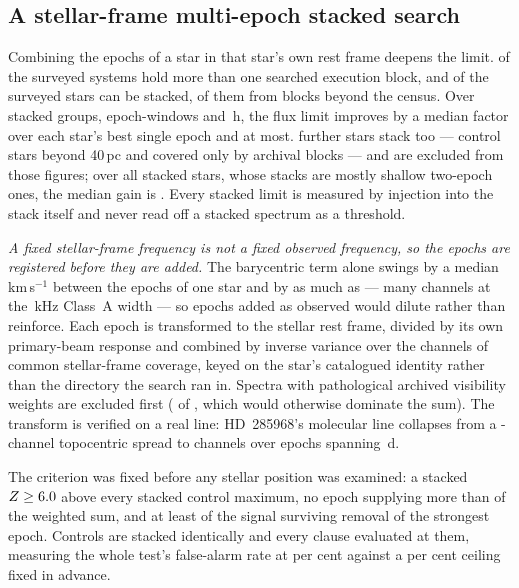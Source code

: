 \subsection{A stellar-frame multi-epoch stacked search}
\label{sec:stack}

Combining the epochs of a star in that star's own rest frame deepens the
limit. \EpMulti{} of the \NSystems{} surveyed systems hold more than one
searched execution block, and \SxStkStarCensus{} of the surveyed stars can be
stacked, \SttNStkOneEb{} of them from blocks beyond the census. Over
\SyStkNGroup{} stacked groups, \SyStkNEpochComb{} epoch-windows and
\SyStkHours\,h, the flux limit improves by a median factor \SyStkGainMed{}
over each star's best single epoch and \SyStkGainMax{} at most.
\SxStkStarOutside{} further stars stack too --- \SyStkStarOos{} control stars
beyond 40\,pc and \SyStkStarOther{} covered only by archival blocks --- and are
excluded from those figures; over all \StkNStar{} stacked stars, whose stacks
are mostly shallow two-epoch ones, the median gain is \StkLimitGainMed. Every
stacked limit is measured by injection into the stack itself and never read
off a stacked spectrum as a threshold.

\emph{A fixed stellar-frame frequency is not a fixed observed frequency, so
the epochs are registered before they are added.} The barycentric term alone
swings by a median \StkVcorrSwingMed\,km\,s$^{-1}$ between the epochs of one
star and by as much as \StkVcorrSwingMax{} --- many channels at the
\StkRefChanKHz\,kHz Class~A width --- so epochs added as observed would dilute
rather than reinforce. Each epoch is transformed to the stellar rest frame,
divided by its own primary-beam response and combined by inverse variance
over the channels of common stellar-frame coverage, keyed on the star's
catalogued identity rather than the directory the search ran in. Spectra with
pathological archived visibility weights are excluded first
(\StkBadWeight{} of \StkNProd, which would otherwise dominate the sum). The transform is verified on a real line: HD~285968's molecular
line collapses from a \StkRegTopoChan-channel topocentric spread to
\StkRegStellarChan{} channels over \StkRegNEpoch{} epochs spanning
\StkRegSpanD\,d.

The criterion was fixed before any stellar position was examined: a stacked
$Z\ge6.0$ above every stacked control maximum, no epoch supplying more
than \StkDomMax{} of the weighted sum, and at least \StkJkMin{} of the signal
surviving removal of the strongest epoch. Controls are stacked identically
and every clause evaluated at them, measuring the whole test's
false-alarm rate at \StkCtrlFap{} per cent against a \StkFapCeil{} per cent
ceiling fixed in advance.

